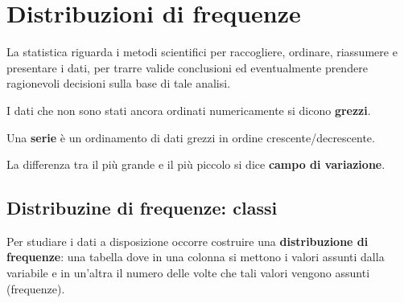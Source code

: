 
\chapter{Distribuzioni di frequenze}
La statistica riguarda i metodi scientifici per raccogliere, ordinare, riassumere e presentare i dati, per trarre valide conclusioni ed eventualmente prendere ragionevoli decisioni sulla base di tale analisi.


I dati che non sono stati ancora ordinati numericamente si dicono \textbf{grezzi}.

Una \textbf{serie} è un ordinamento di dati grezzi in ordine crescente/decrescente.

La differenza tra il più grande e il più piccolo si dice \textbf{campo di variazione}.

\section{Distribuzine di frequenze: classi}
Per studiare i dati a disposizione occorre costruire una \textcolor{viola}{\textbf{distribuzione di frequenze}}: una tabella dove in una colonna si mettono i valori assunti dalla variabile e in un'altra il numero delle volte che tali valori vengono assunti (frequenze).

